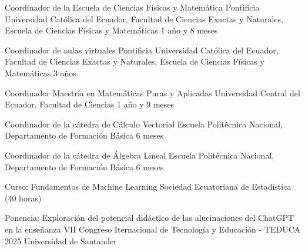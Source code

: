 \documentclass[
    a4paper,
    maincolor=cvblue!70!blue,
    sidecolor=gray!30,
    sectioncolor=cvblue!70!blue,
    sidebarwidth=7.5cm,
    topbottommargin=20pt,
    leftrightmargin=20pt,
]{fortysecondscv}
\begin{document}

    {Coordinador de la Escuela de Ciencias Físicas y Matemática}
    {Pontificia Universidad Católica del Ecuador, Facultad de Ciencias Exactas y Naturales, Escuela de Ciencias Físicas y Matemáticas}
    {1 año y 8 meses}
    
    {Coordinador de aulas virtuales}
    {Pontificia Universidad Católica del Ecuador, Facultad de Ciencias Exactas y Naturales, Escuela de Ciencias Físicas y Matemáticas}
    {3 años}
    
    {Coordinador Maestría en Matemáticas Puras y Aplicadas}
    {Universidad Central del Ecuador, Facultad de Ciencias}
    {1 año y 9 meses}
    
    {Coordinador de la cátedra de Cálculo Vectorial}
    {Escuela Politécnica Nacional, Departamento de Formación Básica}
    {6 meses}
    
    {Coordinador de la cátedra de Álgebra Lineal}
    {Escuela Politécnica Nacional, Departamento de Formación Básica}
    {6 meses}
    



\newpage
{}



    {Curso: Fundamentos de Machine Learning}
    {}
    {Sociedad Ecuatoriana de Estadística (40 horas)}
    
    {Ponencia: Exploración del potencial didáctico de las alucinaciones del ChatGPT en la enseñanza}
    {VII Congreso Iternacional de Tecnología y Educación - TEDUCA 2025}
    {Universidad de Santander}
    
\end{document}
